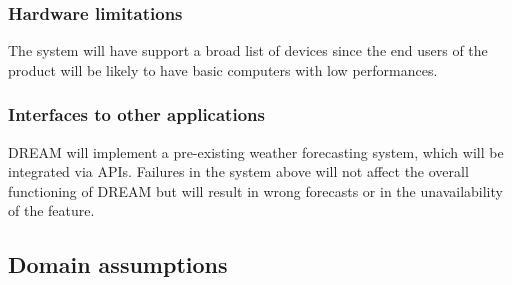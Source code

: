 \documentclass[10pt]{article}
\begin{document}
\subsubsection{Hardware limitations}
The system will have support a broad list of devices since the end users of the product will be likely
to have basic computers with low performances.
\subsubsection{Interfaces to other applications}
DREAM will implement a pre-existing weather forecasting system, which will be integrated via APIs. Failures in the 
system above will not affect the overall functioning of DREAM but will result in wrong forecasts or in the unavailability of the feature.
\subsection{Domain assumptions}
\end{document}
